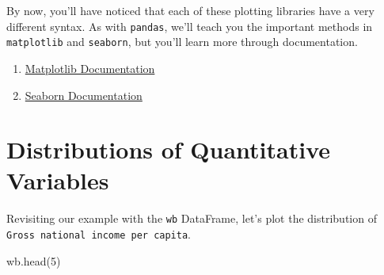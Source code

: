 \documentclass[
  letterpaper,
  DIV=11,
  numbers=noendperiod]{scrreprt}
\newenvironment{Shaded}{\begin{snugshade}}{\end{snugshade}}
\newcommand{\DecValTok}[1]{\textcolor[rgb]{0.68,0.00,0.00}{#1}}
\newcommand{\NormalTok}[1]{\textcolor[rgb]{0.00,0.23,0.31}{#1}}
\providecommand{\tightlist}{%
  \setlength{\itemsep}{0pt}\setlength{\parskip}{0pt}}\usepackage{longtable,booktabs,array}
\begin{document}
By now, you'll have noticed that each of these plotting libraries have a
very different syntax. As with \texttt{pandas}, we'll teach you the
important methods in \texttt{matplotlib} and \texttt{seaborn}, but
you'll learn more through documentation.

\begin{enumerate}
\def\labelenumi{\arabic{enumi}.}
\tightlist
\item
  \href{https://matplotlib.org/stable/index.html}{Matplotlib
  Documentation}
\item
  \href{https://seaborn.pydata.org/}{Seaborn Documentation}
\end{enumerate}

\section{Distributions of Quantitative
Variables}\label{distributions-of-quantitative-variables}

Revisiting our example with the \texttt{wb} DataFrame, let's plot the
distribution of \texttt{Gross\ national\ income\ per\ capita}.

\begin{Shaded}
\begin{Highlighting}[]
\NormalTok{wb.head(}\DecValTok{5}\NormalTok{)}
\end{Highlighting}
\end{Shaded}
\end{document}
